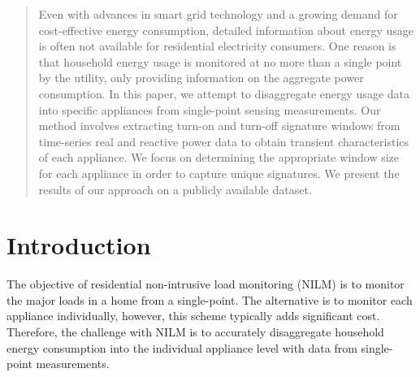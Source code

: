 \documentclass[conference]{IEEEtran}
\begin{document}
\begin{abstract}
Even with advances in smart grid technology and a growing demand for cost-effective  energy consumption, detailed information about energy usage is often not available for residential electricity consumers. One reason is that household energy usage is monitored at no more than a single point by the utility, only providing information on the aggregate power consumption.  In this paper, we attempt to disaggregate  energy usage data into specific appliances from single-point sensing measurements.  Our method involves extracting turn-on and turn-off signature windows from time-series real and reactive power data to obtain transient characteristics of each appliance.  We focus on determining the appropriate window size for each appliance in order to capture unique signatures.  We present the results of our approach on a publicly available dataset.
\end{abstract}





%
\IEEEpeerreviewmaketitle



\section{Introduction}

The objective of residential non-intrusive load monitoring (NILM) is to monitor the major loads in a home from a single-point.  The alternative is to monitor each appliance individually, however, this scheme typically adds significant cost. Therefore, the challenge with NILM is to accurately disaggregate household energy consumption into the individual appliance level with data from single-point measurements.  
\end{document}
